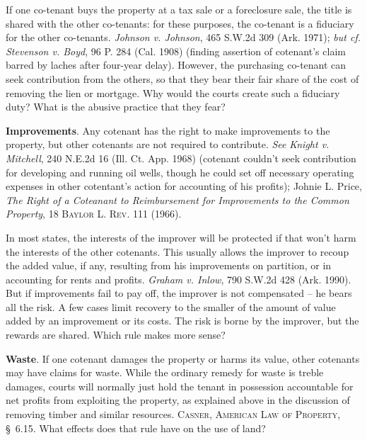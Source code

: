 If one co-tenant buys the property at a tax sale or a foreclosure sale, the
title is shared with the other co-tenants: for these purposes, the co-tenant is
a fiduciary for the other co-tenants. \emph{Johnson v. Johnson}, 465 S.W.2d 309
(Ark. 1971); \textit{but cf.} \emph{Stevenson v. Boyd}, 96 P. 284 (Cal. 1908)
(finding assertion of cotenant's claim barred by laches after four-year delay).
However, the purchasing co-tenant can seek contribution from the others, so that
they bear their fair share of the cost of removing the lien or mortgage. Why
would the courts create such a fiduciary duty? What is the abusive practice that
they fear?


\item \label{bkm:Ref305448174}\textbf{Improvements}. Any cotenant has the right
to make improvements to the property, but other cotenants are not required to
contribute. \emph{See} \emph{Knight v. Mitchell}, 240 N.E.2d 16 (Ill. Ct. App.
1968) (cotenant couldn't seek contribution for developing and running oil wells,
though he could set off necessary operating expenses in other cotentant's action
for accounting of his profits); Johnie L. Price, \textit{The Right of a
Coteanant to Reimbursement for Improvements to the Common Property}, 18
\textsc{Baylor L. Rev}. 111 (1966).

In most states, the interests of the improver will be protected if that won't
harm the interests of the other cotenants. This usually allows the improver to
recoup the added value, if any, resulting from his improvements on partition, or
in accounting for rents and profits. \emph{Graham v. Inlow}, 790 S.W.2d 428
(Ark. 1990). But if improvements fail to pay off, the improver is not
compensated -- he bears all the risk. A few cases limit recovery to the smaller
of the amount of value added by an improvement or its costs. The risk is borne
by the improver, but the rewards are shared. Which rule makes more sense?

\item \textbf{Waste}. If one cotenant damages the property or harms
its value, other cotenants may have claims for waste. While the ordinary
remedy for waste is treble damages, courts will normally just hold the tenant
in possession accountable for net profits from exploiting the property, as
explained above in the discussion of removing timber and similar resources.
\textsc{Casner, American Law of Property}, \S~6.15. What effects does that
rule have on the use of land?


